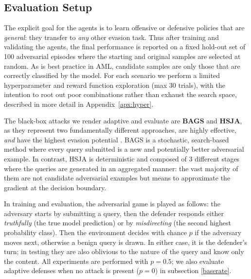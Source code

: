 \subsection{Evaluation Setup}
The explicit goal for the agents is to learn offensive or defensive policies that are \emph{general}: they transfer to \textit{any} other evasion task.
Thus after training and validating the agents, the final performance is reported on a fixed hold-out set of 100 adversarial episodes where the starting and original samples are selected at random.
As is best practice in \gls{AML}, candidate samples are only those that are correctly classified by the model.
For each scenario we perform a limited hyperparameter and reward function exploration (max 30 trials), with the intention to root out poor combinations rather than exhaust the search space, described in more detail in Appendix~\ref{apx:hyper}.

The black-box attacks we render adaptive and evaluate are \textbf{BAGS} and \textbf{HSJA}, as they represent two fundamentally different approaches, are highly effective, \emph{and} have the highest evasion potential \cite{li2022blacklight}.
BAGS is a stochastic, search-based method where every query submitted is a new and potentially better adversarial example.
In contrast, HSJA is deterministic and composed of 3 different stages where the queries are generated in an aggregated manner: the vast majority of them are not candidate adversarial examples but means to approximate the gradient at the decision boundary.

In training and evaluation, the adversarial game is played as follows: the adversary starts by submitting a query, then the defender responds either \emph{truthfully} (the true model prediction) or by \emph{misdirecting} (the second highest probability class).
Then the environment decides with chance $p$ if the adversary moves next, otherwise a benign query is drawn.
In either case, it is the defender's turn; in testing they are also oblivious to the nature of the query and know only the content.
All experiments are performed with $p=0.5$; we also evaluate adaptive defenses when no attack is present ($p=0$) in subsection \ref{baserate}.

